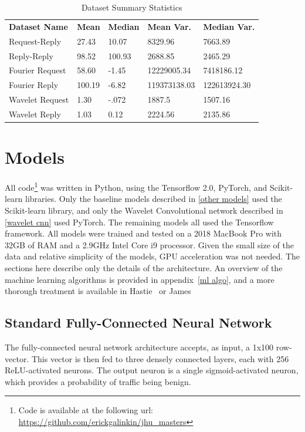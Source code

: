 \documentclass[10pt]{article}
\begin{document}
\renewcommand{\thefootnote}{*} 
\begin{table}[h]
\caption{Dataset Summary Statistics}
\centering
\label{Tab:summary}	
\begin{tabular}{l|llll}
\textbf{Dataset Name} & \textbf{Mean} & \textbf{Median} & \textbf{Mean Var.} & \textbf{Median Var.} \\\cline{1-5}
Request-Reply         & 27.43    & 10.07    & 8329.96    & 7663.89 \\
Reply-Reply           & 98.52    & 100.93   & 2688.85    & 2465.29 \\
Fourier Request       & 58.60\footnotemark    & -1.45    & 12229005.34    & 7418186.12 \\
Fourier Reply         & 100.19\footnotemark    & -6.82    & 119373138.03    & 122613924.30 \\
Wavelet Request       & 1.30    & -.072    & 1887.5    & 1507.16 \\
Wavelet Reply         & 1.03    & 0.12    & 2224.56    & 2135.86                 
\end{tabular}
\end{table}

\renewcommand{\thefootnote}{1}

\section{Models}
All code\footnote{Code is available at the following url: \url{https://github.com/erickgalinkin/jhu_masters}} was written in Python, using the Tensorflow 2.0, PyTorch, and Scikit-learn libraries.
Only the baseline models described in \ref{other models} used the Scikit-learn library, and only the Wavelet Convolutional network described in \ref{wavelet cnn} used PyTorch.
The remaining models all used the Tensorflow framework.
All models were trained and tested on a 2018 MacBook Pro with 32GB of RAM and a 2.9GHz Intel Core i9 processor.
Given the small size of the data and relative simplicity of the models, GPU acceleration was not needed.
The sections here describe only the details of the architecture.
An overview of the machine learning algorithms is provided in appendix~\ref{ml algo}, and a more thorough treatment is available in Hastie~\cite{hastie01statisticallearning} or James~\cite{james14introduction}

\subsection{Standard Fully-Connected Neural Network}
The fully-connected neural network architecture accepts, as input, a 1x100 row-vector. 
This vector is then fed to three densely connected layers, each with 256 ReLU-activated neurons.
The output neuron is a single sigmoid-activated neuron, which provides a probability of traffic being benign.
\end{document}
